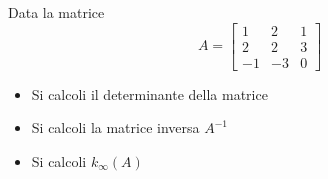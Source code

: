 Data la matrice
\[
A=\left[
\begin{array}{ccc}
1 & 2 & 1 \\
2 & 2 & 3\\
-1 & -3 & 0
\end{array}\right]
\]

\begin{itemize}
\item Si calcoli il determinante della matrice
\item Si calcoli la matrice inversa $A^{-1}$
\item Si calcoli $k_{\infty}(A)$ 

\end{itemize}
